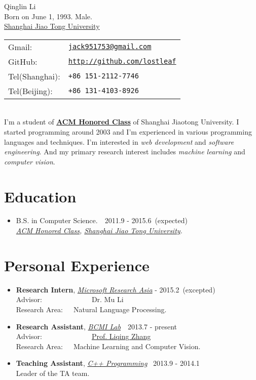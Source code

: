 \documentclass[letterpaper]{article}
\def\name{Qinglin Li}
\begin{document}
\begin{minipage}{0.4\linewidth}
  {\huge \name }
  \vspace{0.1in} \\
  Born on June 1, 1993. Male. \\
  \href{http://www.sjtu.edu.cn/}{Shanghai Jiao Tong University}
\end{minipage}
\begin{minipage}{0.45\linewidth}
  \begin{tabular}{ll}
    Gmail:  & \href{mailto:jack951753@gmail.com}{\tt jack951753@gmail.com} \\
    GitHub: & \href{https://github.com/lostleaf}{\tt http://github.com/lostleaf} \\
    Tel(Shanghai):    & {\tt +86 151-2112-7746}\\
    Tel(Beijing):   & {\tt +86 131-4103-8926}
  \end{tabular}
\end{minipage}

~\\
I'm a student of \textbf{\href{http://acm.sjtu.edu.cn}{ACM Honored Class}} of Shanghai Jiaotong University.
I started programming around 2003 and I'm experienced in various programming languages and techniques.
I'm interested in \emph{web development} and \emph{software engineering}.
And my primary research interest includes \emph{machine learning} and \emph{computer vision}.
\section*{Education}
\begin{itemize}
\item  B.S. in Computer Science.~\quad\qquad~2011.9 - 2015.6~(expected) \\
    \emph{\href{http://acm.sjtu.edu.cn}{ACM Honored Class},
    \href{http://www.sjtu.edu.cn/}{Shanghai Jiao Tong University}.}
\end{itemize}
\section*{Personal Experience}
\begin{itemize}
\item \textbf{Research Intern}, \emph{\href{http://research.microsoft.com/en-us/labs/asia/}{Microsoft Research Asia}}  - 2015.2~(excepted)\\
    Advisor:~~~~~~~~~~~~~~{Dr. Mu Li}\\
    Research Area:~~~Natural Language Processing.
\item \textbf{Research Assistant}, \emph{\href{http://bcmi.sjtu.edu.cn}{BCMI Lab}}\qquad\qquad\qquad~~2013.7 - present\\
    Advisor:~~~~~~~~~~~~~~{\href{http://bcmi.sjtu.edu.cn/~zhangliqing/}{Prof. Liqing Zhang}}\\
    Research Area:~~~Machine Learning and Computer Vision.
\item \textbf{Teaching Assistant},  \emph{\href{http://acm.sjtu.edu.cn/wiki/Programming_2013}{C++ Programming}}\qquad~ 2013.9 - 2014.1\\
Leader of the TA team.
\end{itemize}
\end{document}
